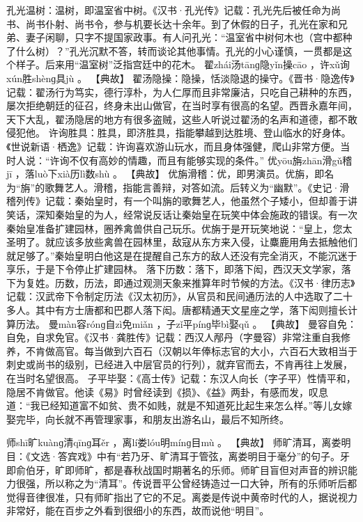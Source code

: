 \documentclass[12pt,UTF8]{ctexbook}
\begin{document}
孔光温树：温树，即温室省中树。《汉书·孔光传》记载：孔光先后被任命为尚书、尚书仆射、尚书令，参与机要长达十余年。到了休假的日子，孔光在家和兄弟、妻子闲聊，只字不提国家政事。有人问孔光：“温室省中树何木也（宫中都种了什么树）？”孔光沉默不答，转而谈论其他事情。孔光的小心谨慎，一贯都是这个样子。后来用“温室树”泛指宫廷中的花木。
翟zhái汤tānɡ隐yǐn操cāo
，许xǔ询xún胜shènɡ具jù
。
【典故】
翟汤隐操：隐操，恬淡隐退的操守。《晋书·隐逸传》记载：翟汤行为笃实，德行淳朴，为人仁厚而且非常廉洁，只吃自己耕种的东西，屡次拒绝朝廷的征召，终身未出山做官，在当时享有很高的名望。西晋永嘉年间，天下大乱，翟汤隐居的地方有很多盗贼，这些人听说过翟汤的名声和道德，都不敢侵犯他。
许询胜具：胜具，即济胜具，指能攀越到达胜境、登山临水的好身体。《世说新语·栖逸》记载：许询喜欢游山玩水，而且身体强健，爬山非常方便。当时人说：“许询不仅有高妙的情趣，而且有能够实现的条件。”
优yōu旃zhān滑gǔ稽jī
，落luò下xià历lì数shù
。
【典故】
优旃滑稽：优，即男演员。优旃，即名为“旃”的歌舞艺人。滑稽，指能言善辩，对答如流。后转义为“幽默”。《史记·滑稽列传》记载：秦始皇时，有一个叫旃的歌舞艺人，他虽然个子矮小，但却善于讲笑话，深知秦始皇的为人，经常说反话让秦始皇在玩笑中体会施政的错误。有一次秦始皇准备扩建园林，圈养禽兽供自己玩乐。优旃于是开玩笑地说：“皇上，您太圣明了。就应该多放些禽兽在园林里，敌寇从东方来入侵，让麋鹿用角去抵触他们就足够了。”秦始皇明白他这是在提醒自己东方的敌人还没有完全消灭，不能沉迷于享乐，于是下令停止扩建园林。
落下历数：落下，即落下闳，西汉天文学家，落下为复姓。历数，历法，即通过观测天象来推算年时节候的方法。《汉书·律历志》记载：汉武帝下令制定历法《汉太初历》，从官员和民间通历法的人中选取了二十多人。其中有方士唐都和巴郡人落下闳。唐都精通天文星座之学，落下闳则擅长计算历法。
曼màn容rónɡ自zì免miǎn
，子zǐ平pínɡ毕bì娶qǔ
。
【典故】
曼容自免：自免，自求免官。《汉书·龚胜传》记载：西汉人邴丹（字曼容）非常注重自我修养，不肯做高官。每当做到六百石（汉朝以年俸标志官的大小，六百石大致相当于刺史或尚书的级别，已经进入中层官员的行列），就弃官而去，不肯再往上发展，在当时名望很高。
子平毕娶：《高士传》记载：东汉人向长（字子平）性情平和，隐居不肯做官。他读《易》时曾经读到《损》、《益》两卦，有感而发，叹息道：“我已经知道富不如贫、贵不如贱，就是不知道死比起生来怎么样。”等儿女嫁娶完毕，向长就不再管理家事，和朋友出游名山，最后不知所终。

师shī旷kuànɡ清qīnɡ耳ěr
，离lí娄lóu明mínɡ目mù
。
【典故】
师旷清耳，离娄明目：《文选·答宾戏》中有“若乃牙、旷清耳于管弦，离娄明目于毫分”的句子。牙即俞伯牙，旷即师旷，都是春秋战国时期著名的乐师。师旷目盲但对声音的辨识能力很强，所以称之为“清耳”。传说晋平公曾经铸造过一口大钟，所有的乐师听后都觉得音律很准，只有师旷指出了它的不足。离娄是传说中黄帝时代的人，据说视力非常好，能在百步之外看到很细小的东西，故而说他“明目”。
\end{document}
